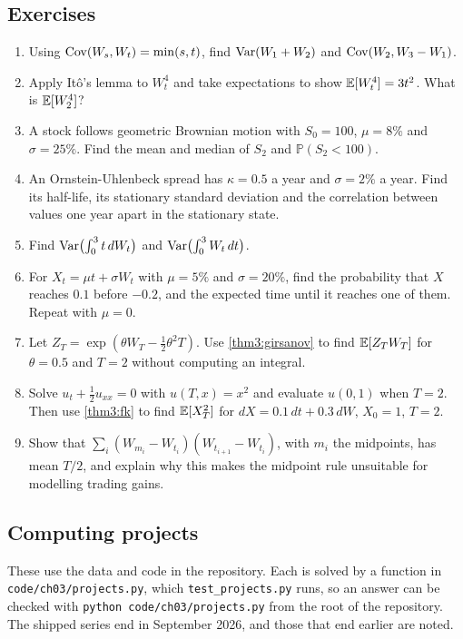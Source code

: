\begin{chapterrefs}
\FloatBarrier
\section{Exercises}
\label{sec3:exercises}

\begin{enumerate}[label=\textbf{3.\arabic*}, leftmargin=*, ref=3.\arabic*]
  \item\label{ex3:one} Using $\operatorname{Cov}(W_s,W_t)=\min(s,t)$, find $\operatorname{Var}(W_1+W_2)$ and $\operatorname{Cov}(W_2,W_3-W_1)$.
  \item\label{ex3:two} Apply It\^o's lemma to $W_t^4$ and take expectations to show $\mathbb{E}[W_t^4]=3t^2$. What is
  $\mathbb{E}[W_2^4]$?
  \item\label{ex3:three} A stock follows geometric Brownian motion with $S_0=100$, $\mu=8\%$ and
  $\sigma=25\%$. Find the mean and median of $S_2$ and $\mathbb P(S_2<100)$.
  \item\label{ex3:four} An Ornstein-Uhlenbeck spread has $\kappa=0.5$ a year and $\sigma=2\%$ a year. Find
  its half-life, its stationary standard deviation and the correlation between values one year apart in
  the stationary state.
  \item\label{ex3:five} Find $\operatorname{Var}\bigl(\int_0^3t\,dW_t\bigr)$ and $\operatorname{Var}\bigl(\int_0^3W_t\,dt\bigr)$.
  \item\label{ex3:six} For $X_t=\mu t+\sigma W_t$ with $\mu=5\%$ and $\sigma=20\%$, find the probability that
  $X$ reaches $0.1$ before $-0.2$, and the expected time until it reaches one of them. Repeat with $\mu=0$.
  \item\label{ex3:seven} Let $Z_T=\exp(\theta W_T-\tfrac12\theta^2T)$. Use \cref{thm3:girsanov} to find
  $\mathbb{E}[Z_TW_T]$ for $\theta=0.5$ and $T=2$ without computing an integral.
  \item\label{ex3:eight} Solve $u_t+\tfrac12u_{xx}=0$ with $u(T,x)=x^2$ and evaluate $u(0,1)$ when $T=2$.
  Then use \cref{thm3:fk} to find $\mathbb{E}[X_T^2]$ for $dX=0.1\,dt+0.3\,dW$, $X_0=1$, $T=2$.
  \item\label{ex3:nine} Show that $\sum_i(W_{m_i}-W_{t_i})(W_{t_{i+1}}-W_{t_i})$, with $m_i$ the midpoints,
  has mean $T/2$, and explain why this makes the midpoint rule unsuitable for modelling trading gains.
\end{enumerate}

\subsection*{Computing projects}
\label{sec3:projects}
These use the data and code in the repository. Each is solved by a function in
\texttt{code/ch03/projects.py}, which \texttt{test\_projects.py} runs, so an answer can be
checked with \texttt{python code/ch03/projects.py} from the root of the repository. The
shipped series end in September 2026, and those that end earlier are noted.


\end{chapterrefs}
